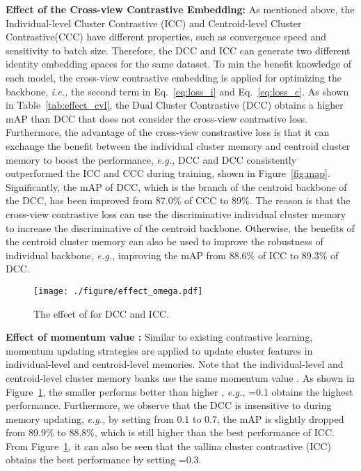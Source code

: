 \documentclass[10pt,twocolumn,letterpaper]{article}
\begin{document}
\textbf{Effect of the Cross-view Contrastive Embedding:}
As mentioned above, the Individual-level Cluster Contrastive (ICC) and Centroid-level Cluster Contrastive(CCC) have different properties, such as convergence speed and sensitivity to batch size. 
Therefore, the DCC and ICC can generate two different identity embedding spaces for the same dataset.
To min the benefit knowledge of each model, the cross-view contrastive embedding is applied for optimizing the backbone, \emph{i.e.,} the second term in Eq.~\eqref{eq:loss_i} and Eq.~\eqref{eq:loss_c}.
As shown in Table~\ref{tab:effect_cvl}, the Dual Cluster Contrastive (DCC) obtains a higher mAP than  DCC that does not consider the cross-view contrastive loss.
Furthermore, the advantage of the cross-view constrastive loss is that it can exchange the benefit between the individual cluster memory and centroid cluster memory to boost the performance, \emph{e.g.,} DCC and DCC consistently outperformed the ICC and CCC during training, shown in Figure~\ref{fig:map}. 
Significantly, the mAP of DCC, which is the branch of the centroid backbone of the DCC, has been improved from 87.0\% of CCC to 89\%.
The reason is that the cross-view contrastive loss can use the discriminative individual cluster memory to increase the discriminative of the centroid backbone.
Otherwise, the benefits of the centroid cluster memory can also be used to improve the robustness of individual backbone, \emph{e.g.,} improving the mAP from 88.6\% of ICC to 89.3\% of DCC.

\begin{figure}
\centering
\texttt{[image: ./figure/effect\_omega.pdf]}
\vspace{-1.0em}
\caption{\small The effect of  for DCC and ICC.}
\label{fig:effect_omega}
\end{figure}

\textbf{Effect of momentum value :}
Similar to existing contrastive learning, momentum updating strategies are applied to update cluster features in individual-level  and centroid-level  memories.  
Note that the individual-level and centroid-level cluster memory banks use the same momentum value .
As shown in Figure~\ref{fig:effect_omega}, the smaller  performs better than higher , \emph{e.g.,} =0.1 obtains the highest performance. 
Furthermore, we observe that the DCC is insensitive to  during memory updating, \emph{e.g.,} by setting  from 0.1 to 0.7, the mAP is slightly dropped from 89.9\% to 88.8\%, which is still higher than the best performance of ICC. 
From Figure~\ref{fig:effect_omega}, it can also be seen that the vallina cluster contrastive (ICC) obtains the best performance by setting =0.3.
\end{document}
